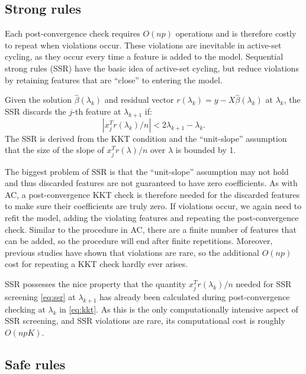 \subsection{Strong rules}

Each post-convergence check requires $O(np)$ operations and is therefore costly to repeat when violations occur.  These violations are inevitable in active-set cycling, as they occur every time a feature is added to the model.  Sequential strong rules (SSR) \citep{tibshirani2011regression} have the basic idea of active-set cycling, but reduce violations by retaining features that are ``close'' to entering the model.

Given the solution $\hat{\beta}(\lambda_k)$ and residual vector $r(\lambda_k)=y-X\hat{\beta}(\lambda_k)$ at $\lambda_k$, the SSR discards the $j$-th feature at $\lambda_{k+1}$ if:
\begin{equation}
  \label{eq:ssr}
  |x_j^Tr(\lambda_k)/n|<2\lambda_{k+1}-\lambda_k.
\end{equation}
The SSR is derived from the KKT condition and the ``unit-slope'' assumption that the size of the slope of $x_j^Tr(\lambda)/n$ over $\lambda$ is bounded by 1. 

The biggest problem of SSR is that the ``unit-slope'' assumption may not hold and thus discarded features are not guaranteed to have zero coefficients. As with AC, a post-convergence KKT check is therefore needed for the discarded features to make sure their coefficients are truly zero. If violations occur, we again need to refit the model, adding the violating features and repeating the post-convergence check. Similar to the procedure in AC, there are a finite number of features that can be added, so the procedure will end after finite repetitions. Moreover, previous studies have shown that violations are rare, so the additional $O(np)$ cost for repeating a KKT check hardly ever arises.

SSR possesses the nice property that the quantity $x_j^Tr(\lambda_k)/n$ needed for SSR screening \eqref{eq:ssr} at $\lambda_{k+1}$ has already been calculated during post-convergence checking at $\lambda_k$ in \eqref{eq:kkt}. As this is the only computationally intensive aspect of SSR screening, and SSR violations are rare, its computational cost is roughly $O(npK)$.

\subsection{Safe rules}
\label{sec:safe}

